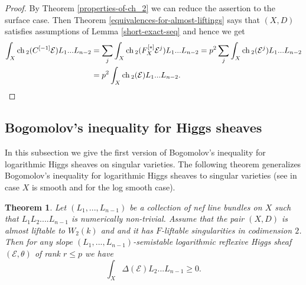 \documentclass[12pt]{article}
\theoremstyle{plain}
\newtheorem{Theorem}[Thm]{\sc Theorem}
\theoremstyle{definition}
\theoremstyle{remark}
\newcommand{\cE}{{\mathcal E}}
\newcommand{\ch}{{\mathop{\rm ch \, }}}
\begin{document}
\begin{proof}
By Theorem \ref{properties-of-ch_2} we can reduce the assertion to the surface case. Then Theorem \ref{equivalences-for-almost-liftings} says that $(X,D)$ satisfies assumptions of 
Lemma \ref{short-exact-seq} and hence we get
\begin{align*}
\int _X \ch _2  (C^{[-1]}\cE)L_1...L_{n-2}&=\sum _j \int _X \ch _2  (F_X^{[*]}  \cE ^j)L_1...L_{n-2}=p^2 \sum _j \int _X \ch _2  ( \cE ^j)L_1...L_{n-2}\\
&=p^2\int _X\ch _2   (\cE)L_1...L_{n-2}.
\end{align*}
\end{proof}

\subsection{Bogomolov's inequality for Higgs sheaves}

In this subsection we give the first version of Bogomolov's inequality for 
logarithmic Higgs sheaves on singular varieties. 
The following theorem generalizes Bogomolov's inequality for logarithmic Higgs
sheaves to singular varieties (see \cite[Theorem 8]{La3} in case $X$ is smooth
and \cite[Theorem 3.3]{La4} for the log smooth case).


\begin{Theorem} \label{log-Bogomolov-with-lifting} 
	Let  $(L_1,...,L_{n-1})$ be a collection of nef line bundles on $X$ such that $L_1L_2....L_{n-1}$ is numerically non-trivial. Assume that the pair $(X,D)$ is  almost liftable to $W_2(k)$ and and it has  $F$-liftable singularities in codimension $2$.  Then for any
	slope $(L_1,...,L_{n-1})$-semistable logarithmic reflexive Higgs sheaf $(\cE, \theta)$ of rank
	$r\le p$ we have
	$$\int_X \Delta (\cE) L_2...L_{n-1}\ge 0.$$
\end{Theorem}
\end{document}
